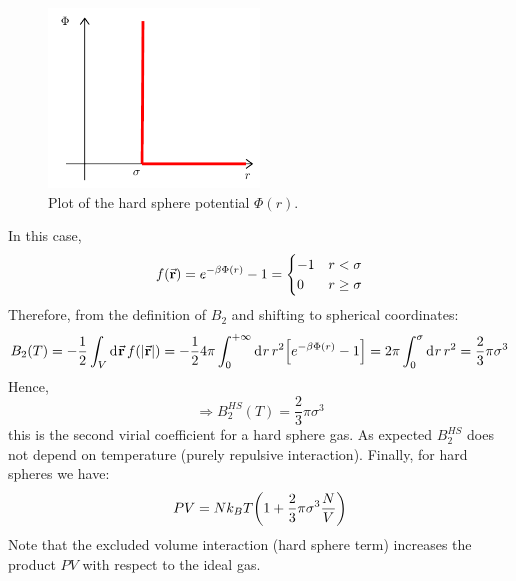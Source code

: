 \documentclass[../main/main.tex]{subfiles}
\begin{document}
\begin{figure}[h!]
\centering
\includegraphics[width=0.5\textwidth]{../lessons/15_image/1.pdf}
\caption{\label{fig:15_12} Plot of the hard sphere potential \( \Phi (r) \).}
\end{figure}

In this case,
\begin{equation}
  f(\va{r}) = e^{-\beta \Phi (r)} -1 = \begin{cases}
    -1 & r < \sigma\\
    0 & r \ge \sigma
  \end{cases}
\end{equation}
Therefore, from the definition of \( B_2 \) and shifting to spherical coordinates:
\begin{equation*}
  B_2 (T)= - \frac{1}{2} \int_{V}^{} \dd[]{\va{r}}  f \qty(\abs{\va{r}} )
  = - \frac{1}{2} 4 \pi \int_{0}^{+ \infty } \dd[]{r} r^2 \qty[e^{-\beta \Phi (r)}-1 ]
  = 2 \pi \int_{0}^{\sigma } \dd[]{r} r^2 = \frac{2}{3} \pi  \sigma ^3
\end{equation*}
Hence,
\begin{equation}
  \Rightarrow B_2^{HS} (T) = \frac{2}{3} \pi  \sigma ^3
\end{equation}
this is the second virial coefficient for a hard sphere gas.
As expected \(  B_2^{HS} \) does not depend on temperature (purely repulsive interaction). Finally, for hard spheres we have:
\begin{equation}
  P V = N k_B T \qty(1 + \frac{2}{3} \pi \sigma ^3 \frac{N}{V})
\end{equation}
Note that the excluded volume interaction (hard sphere term) increases the product \( PV \) with respect to the ideal gas.
\end{document}

